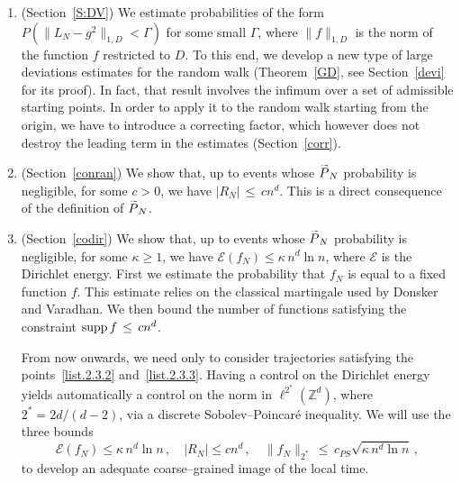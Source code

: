 \documentclass[AHL, Unicode, longabstracts, published]{cedram}
\newcommand*\supp{\text{supp\,}}
\newcommand*\Zd {{\mathbb Z^d}}
\newcommand*\wP{\smash{\widetilde P}}
\newcommand{\cE}{\mathcal{E}}
\newcommand*{\romanenumi}{\renewcommand*{\theenumi}{\roman{enumi}}}
\begin{document}
\begin{enumerate}\romanenumi
\item \label{list.2.3.1}(Section~\ref{S:DV}) We estimate probabilities of the form $P(\|L_N-g^2\|_{1,D}<\Gamma)$ for some small $\Gamma$, where $\| f \|_{1,D}$ is the norm of the function $f$ restricted to $D$. To this end, we develop a new type of large deviations estimates for the random walk (Theorem~\ref{GD}, see Section~\ref{devi} for its proof). In fact, that result involves the infimum over a set of admissible starting points. In order to apply it to the random walk starting from the origin, we have to introduce a correcting factor, which however does not destroy the leading term in the estimates (Section~\ref{corr}).
%



\item \label{list.2.3.2}(Section~\ref{conran}) We show that, up to events whose $\wP_N$ probability is negligible, for some $c>0$, we have $|R_N|\,\leq\, cn^d$. This is a direct consequence of the definition of $\wP_N$.

\item \label{list.2.3.3}(Section~\ref{codir}) We show that, up to events whose $\wP_N$ probability is negligible, for some $\kappa\geq 1$, we have $\cE(f_N)\leq\kappa \,n^d\ln n$, where $\cE$ is the Dirichlet energy. First we estimate the probability that $f_N$ is equal to a fixed function $f$. This estimate relies on the classical martingale used by Donsker and Varadhan. We then bound the number of functions satisfying the constraint $\supp f\,\leq\, cn^d$.

From now onwards, we need only to consider trajectories satisfying the points~\eqref{list.2.3.2} and~\eqref{list.2.3.3}. Having a control on the Dirichlet energy yields automatically a control on the norm in $\ell^{2^*}(\Zd)$, where $2^*=2d/(d-2)$, via a discrete Sobolev--Poincaré inequality. We will use the three bounds
\[
\cE(f_N)\leq\kappa \,n^d\ln n\,,\quad
|R_N|\leq cn^d\,,\quad \|f_N\|_{2^*}
\,\leq\, c_{PS}
\sqrt{\kappa \,n^d\ln n}\,,
\]
to develop an adequate coarse--grained image of the local time.



\end{enumerate}
\end{document}
